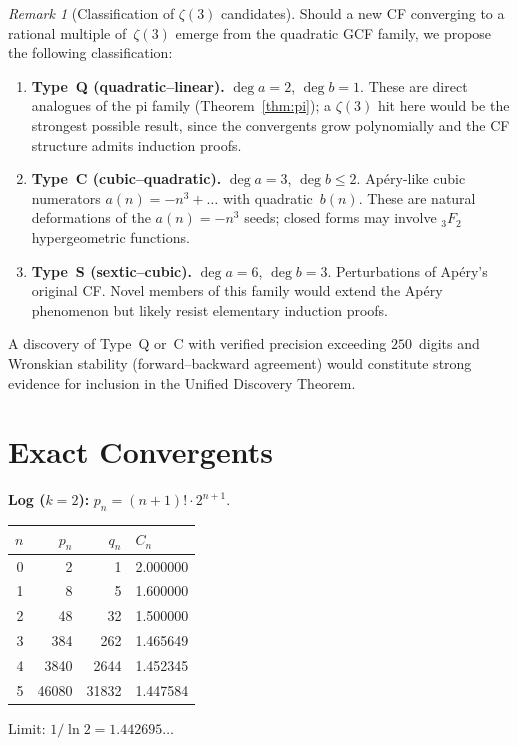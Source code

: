 \documentclass[11pt,a4paper]{article}
\theoremstyle{plain}
\theoremstyle{remark}
\newtheorem{remark}[theorem]{Remark}
\begin{document}
\begin{remark}[Classification of $\zeta(3)$ candidates]\label{rem:z3class}
Should a new CF converging to a rational multiple of~$\zeta(3)$
emerge from the quadratic GCF family, we propose the following
classification:
\begin{enumerate}
\item \textbf{Type~Q (quadratic--linear).}
  $\deg a = 2$, $\deg b = 1$.
  These are direct analogues of the pi family
  (Theorem~\ref{thm:pi}); a $\zeta(3)$ hit here would be
  the strongest possible result, since the convergents grow
  polynomially and the CF structure admits induction proofs.
\item \textbf{Type~C (cubic--quadratic).}
  $\deg a = 3$, $\deg b \le 2$.
  Ap\'ery-like cubic numerators $a(n) = -n^3 + \ldots$
  with quadratic~$b(n)$.  These are natural deformations
  of the $a(n)=-n^3$ seeds; closed forms may involve
  ${}_3F_2$ hypergeometric functions.
\item \textbf{Type~S (sextic--cubic).}
  $\deg a = 6$, $\deg b = 3$.
  Perturbations of Ap\'ery's original CF.
  Novel members of this family would extend the Ap\'ery
  phenomenon but likely resist elementary induction proofs.
\end{enumerate}
A discovery of Type~Q or~C with verified precision exceeding
$250$~digits and Wronskian stability (forward--backward
agreement) would constitute strong evidence for inclusion
in the Unified Discovery Theorem.
\end{remark}

\appendix
\section{Exact Convergents}\label{app:conv}

\textbf{Log ($k{=}2$):} $p_n = (n{+}1)!\cdot 2^{n+1}$.

\smallskip
\begin{center}
\begin{tabular}{@{}rrrl@{}}
\toprule
$n$ & $p_n$ & $q_n$ & $C_n$ \\
\midrule
0 & 2 & 1 & 2.000000 \\
1 & 8 & 5 & 1.600000 \\
2 & 48 & 32 & 1.500000 \\
3 & 384 & 262 & 1.465649 \\
4 & 3840 & 2644 & 1.452345 \\
5 & 46080 & 31832 & 1.447584 \\
\bottomrule
\end{tabular}
\end{center}
\smallskip\noindent Limit: $1/\ln 2 = 1.442695\ldots$
\end{document}
